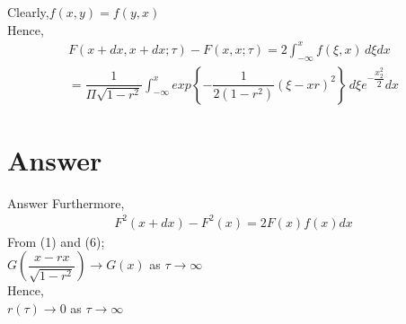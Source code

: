 \documentclass{beamer}
\begin{document}
	 \begin{frame}
	 Clearly,$f(x,y) = f(y,x)$\\
	 Hence,\\
	 \begin{align}
	 F(x+dx,x+dx;\tau)-F(x,x;\tau) = 2\int_{-\infty}^{x}f(\xi,x)\,d\xi dx\\
	                               = \dfrac{1}{\Pi\sqrt{1-r^2}}\int_{-\infty}^{x}exp\left\lbrace-\dfrac{1}{2(1-r^2)}(\xi-xr)^2 \right\rbrace\,d\xi e^{-\dfrac{x_2^2}{2}}dx
	 \end{align}
	 \end{frame}
	 
	\section{Answer}
	\begin{frame}{Answer}
	   Furthermore,
	   \begin{align}
	   F^2(x+dx)-F^2(x) = 2F(x)f(x)dx
	   \end{align}
	  From (1) and (6);\\
	  $G\left( \dfrac{x-rx}{\sqrt{1-r^2}}\right)  \rightarrow G(x)$ as $\tau \rightarrow \infty$\\
	  Hence,\\
	  $r(\tau) \rightarrow 0$ as $\tau \rightarrow \infty$	  
	\end{frame}
\end{document}

